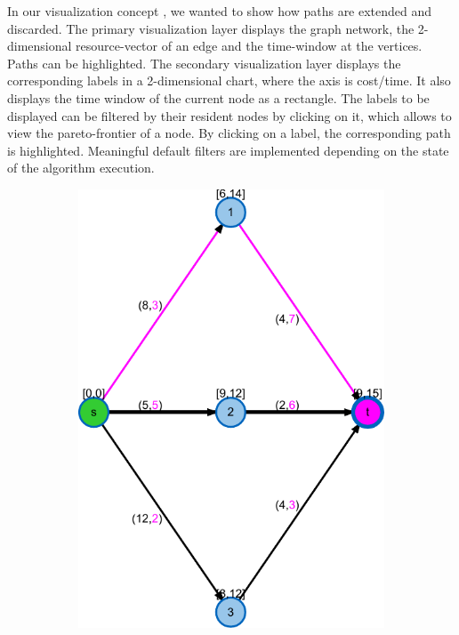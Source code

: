 
In our visualization concept , we wanted to show how paths are extended and discarded. The primary visualization layer displays the graph network, the 2-dimensional resource-vector of an edge and the time-window at the vertices. Paths can be highlighted. The secondary visualization layer displays the corresponding labels in a 2-dimensional chart, where the axis is cost/time. It also displays the time window of the current node as a rectangle. The labels to be displayed can be filtered by their resident nodes by clicking on it, which allows to view the pareto-frontier of a node. By clicking on a label, the corresponding path is highlighted. Meaningful default filters are implemented depending on the state of the algorithm execution.
\begin{figure}
\centering
\begin{subfigure}[t]{0.45\textwidth}
\includegraphics[width=\textwidth]{fig/spp-rc-graph-algorithm-graph}

\end{subfigure}
\end{figure}

